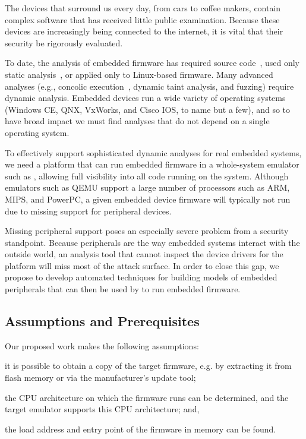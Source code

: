 The devices that surround us every day, from cars to coffee makers,
contain complex software that has received little public examination.
Because these devices are increasingly being connected to the internet,
it is vital that their security be rigorously evaluated.

To date, the analysis of embedded firmware has required source
code~\cite{davidson:2013:fie}, used only static
analysis~\cite{dreissen:2012:satphone}, or applied only to Linux-based
firmware. Many advanced analyses (e.g., concolic
execution~\cite{godefroid:2005:dart}, dynamic taint analysis, and
fuzzing) require dynamic analysis. Embedded devices run a wide variety
of operating systems (Windows CE, QNX, VxWorks, and Cisco IOS, to name
but a few), and so to have broad impact we must find analyses that do
not depend on a single operating system.

To effectively support sophisticated dynamic analyses for real embedded
systems, we need a platform that can run embedded firmware in a
whole-system emulator such as \dynamicsys, allowing full visibility
into all code running on the system. Although emulators such as QEMU
support a large number of processors such as ARM, MIPS, and PowerPC, a
given embedded device firmware will typically not run due to missing
support for peripheral devices.

Missing peripheral support poses an especially severe problem from a
security standpoint. Because peripherals are the way embedded systems
interact with the outside world, an analysis tool that cannot inspect
the device drivers for the platform will miss most of the attack
surface. In order to close this gap, we propose to develop automated
techniques for building models of embedded peripherals that can then be
used by \dynamicsys to run embedded firmware.

\subsection{Assumptions and Prerequisites}

Our proposed work makes the following assumptions:
\begin{inparaenum}[i)]
    \item it is possible to obtain a copy of the target firmware, e.g.
    by extracting it from flash memory or via the manufacturer's update
    tool;
    \item the CPU architecture on which the firmware runs can be
    determined, and the target emulator supports this CPU architecture;
    and,
    \item the load address and entry point of the firmware in memory can
    be found.
\end{inparaenum}

